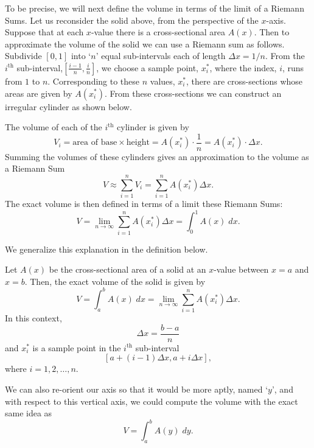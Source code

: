 \documentclass{ximera}
\begin{document}
\begin{explanation}
To be precise, we will next define the volume in terms of the limit of a Riemann Sums.  
Let us reconsider the solid above, from the perspective of the $x$-axis. Suppose that at
each $x$-value there is a cross-sectional area $A(x)$. Then to approximate the volume of the solid we 
can use a Riemann sum as follows. Subdivide $[0,1]$ into `$n$' equal sub-intervals each of length $\Delta x = 1/n$.
From the $i^\text{th}$ sub-interval,$\left[\frac{i-1}{n}, \frac{i}{n}\right]$, we choose a sample point, $x_i^*$, where 
the index, $i$, runs from $1$ to $n$. 
Corresponding to these $n$ values, $x_i^*$, there are cross-sections whose areas are given by $A(x_i^*)$.
From these cross-sections we can construct an irregular cylinder as shown below.


The volume of each of the $i^\text{th}$ cylinder is given by
\[
V_i = \text{area of base} \times \text{height} = A(x_i^*) \cdot \frac{1}{n} = A(x_i^*) \cdot \Delta x.
\]
Summing the volumes of these cylinders gives an approximation to the volume as a Riemann Sum
\[
V \approx \sum_{i=1}^n V_i = \sum_{i=1}^n A(x_i^*) \Delta x.
\]
The exact volume is then defined in terms of a limit these Riemann Sums:
\[
V = \lim_{n \to \infty} \sum_{i=1}^n A(x_i^*) \Delta x = \int_0^1 A(x) \; dx.
\]

\end{explanation}

We generalize this explanation in the definition below.

\begin{definition}
Let $A(x)$ be the cross-sectional area of a solid at an $x$-value between $x = a$ and $x=b$. Then, the exact volume of the solid is given by
\[
V = \int_a^b A(x) \; dx = \lim_{n \to \infty} \sum_{i=1}^n A(x_i^*) \Delta x.
\]
In this context, 
\[
\Delta x = \frac{b-a}{n}
\] 
and $x_i^*$ is a sample point in the $i^\text{th}$ sub-interval
\[
[a + (i-1)\Delta x, a + i\Delta x],
\]
where $i = 1, 2, \dots, n$.
\end{definition}




\begin{remark}
We can also re-orient our axis so that it would be more aptly, named `$y$', and with respect to this vertical axis, 
we could compute the volume with the exact same idea as
\[
V = \int_a^b A(y) \; dy.
\]

\end{remark}
\end{document}
